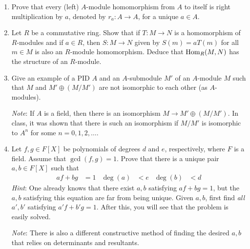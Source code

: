 \documentclass[../psets.tex]{subfiles}
\begin{document}
\begin{enumerate}
    \item Prove that every (left) $A$-module homomorphism from $A$ to itself is right multiplication by $a$, denoted by $r_a:A\to A$, for a unique $a\in A$. %
    \item Let $R$ be a commutative ring. Show that if $T:M\to N$ is a homomorphism of $R$-modules and if $a\in R$, then $S:M\to N$ given by $S(m)=aT(m)$ for all $m\in M$ is also an $R$-module homomorphism. Deduce that $\operatorname{Hom}_R(M,N)$ has the structure of an $R$-module.
    \item Give an example of a PID $A$ and an $A$-submodule $M'$ of an $A$-module $M$ such that $M$ and $M'\oplus(M/M')$ are not isomorphic to each other (as $A$-modules).\par
    \emph{Note}: If $A$ is a field, then there is an isomorphism $M\to M'\oplus(M/M')$. In class, it was shown that there is such an isomorphism if $M/M'$ is isomorphic to $A^n$ for some $n=0,1,2,\dots$.
    \item Let $f,g\in F[X]$ be polynomials of degrees $d$ and $e$, respectively, where $F$ is a field. Assume that $\gcd(f,g)=1$. Prove that there is a unique pair $a,b\in F[X]$ such that
    \begin{align*}
        af+bg &= 1&
        \deg(a) &< e&
        \deg(b) &< d
    \end{align*}
    \emph{Hint}: One already knows that there exist $a,b$ satisfying $af+bg=1$, but the $a,b$ satisfying this equation are far from being unique. Given $a,b$, first find \emph{all} $a',b'$ satisfying $a'f+b'g=1$. After this, you will see that the problem is easily solved.\par
    \emph{Note}: There is also a different constructive method of finding the desired $a,b$ that relies on determinants and resultants.
\end{enumerate}
\end{document}
